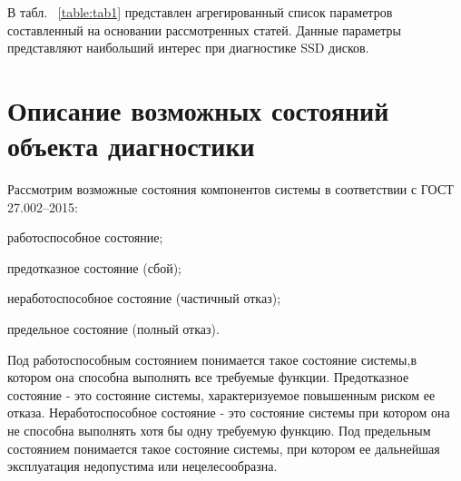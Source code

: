 В табл.  ~\ref{table:tab1} представлен агрегированный список параметров составленный на основании рассмотренных статей. Данные параметры представляют наибольший интерес при диагностике SSD дисков. 

\section{Описание возможных состояний объекта диагностики}
Рассмотрим возможные состояния компонентов системы в соответствии с ГОСТ 27.002–2015:
\begin{itemize*}
	\item{работоспособное состояние;}
	\item{предотказное состояние (сбой);}
	\item{неработоспособное состояние (частичный отказ);}
	\item{предельное состояние (полный отказ).}
\end{itemize*}
Под работоспособным состоянием понимается такое состояние системы,в котором она способна выполнять все требуемые функции. 
Предотказное состояние - это состояние системы, характеризуемое повышенным риском ее отказа. 
Неработоспособное состояние - это состояние системы при котором она не способна выполнять хотя бы одну требуемую функцию.
Под предельным состоянием понимается такое состояние системы, при котором ее дальнейшая эксплуатация недопустима или нецелесообразна. 

